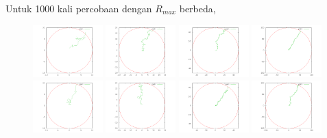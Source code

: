 \documentclass[paper=a4, fontsize=11pt]{scrartcl}
\numberwithin{equation}{section} %
\numberwithin{figure}{section} %
\numberwithin{table}{section} %
\begin{document}
\newpage
Untuk 1000 kali percobaan dengan $R_{max}$ berbeda,
\begin{figure}
	\centering
	\includegraphics[width=0.24\textwidth]{hiker-plot-10-1.png}
	\includegraphics[width=0.24\textwidth]{hiker-plot-20-1.png}
	\includegraphics[width=0.24\textwidth]{hiker-plot-50-1.png}
	\includegraphics[width=0.24\textwidth]{hiker-plot-100-1.png}
	\includegraphics[width=0.24\textwidth]{hiker-plot-10-2.png}
	\includegraphics[width=0.24\textwidth]{hiker-plot-20-2.png}
	\includegraphics[width=0.24\textwidth]{hiker-plot-50-2.png}
	\includegraphics[width=0.24\textwidth]{hiker-plot-100-2.png}

\end{figure}
\end{document}
